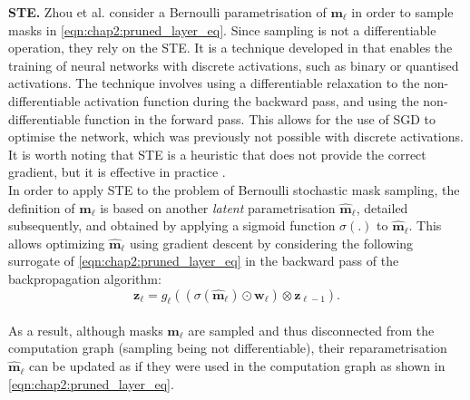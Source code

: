 \noindent\textbf{\acl{STE}.} Zhou et al. \cite{DBLP:conf/nips/ZhouLLY19}
consider a Bernoulli parametrisation of $\bm{m}_\ell$ in order to
sample masks in \cref{eqn:chap2:pruned_layer_eq}. Since sampling is not a
differentiable operation, they rely on the \ac{STE}. It is a technique developed
in \cite{DBLP:journals/corr/BengioLC13} that enables the training of neural
networks with discrete activations, such as binary or quantised activations. The
technique involves using a differentiable relaxation to the non-differentiable
activation function during the backward pass, and using the non-differentiable
function in the forward pass. This allows for the use of \ac{SGD} to optimise
the network, which was previously not possible with discrete activations. It is
worth noting that \ac{STE} is a heuristic that does not provide the correct
gradient, but it is effective in practice \cite{DBLP:journals/corr/BengioLC13}.\\

In order to apply \ac{STE} to the problem of Bernoulli stochastic mask
sampling, the definition of $\bm{m}_\ell$ is based on another
  {\it latent} parametrisation $\bm{\hat{m}}_\ell$, detailed
subsequently, and obtained by applying a sigmoid function $\sigma(.)$ to
$\bm{\hat{m}}_\ell$. This allows optimizing $\bm{\hat{m}}_\ell$  using gradient
descent by considering the following surrogate of
\cref{eqn:chap2:pruned_layer_eq} in the backward pass of the backpropagation
algorithm:\\

\begin{equation}
  \label{eqn:chap2:pruned_layer_eq2}
  \mathbf{z}_{\ell} = g_\ell( ( \sigma(\bm{\hat{m}}_\ell) \odot \bm{w}_\ell ) \otimes \mathbf{z}_{\ell-1} ).
\end{equation} \\

\noindent As a result, although masks $\bm{m}_\ell$ are sampled and thus
disconnected from the computation graph (sampling being not differentiable),
their reparametrisation $\bm{\hat{m}}_\ell$ can be updated as if they were used
in the computation graph as shown in \cref{eqn:chap2:pruned_layer_eq}.\\


